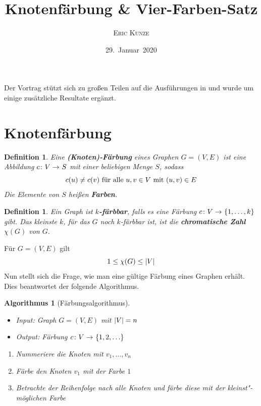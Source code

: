 \documentclass[ngerman, a4paper, 12pt]{article}
\newcommand{\begriff}[1]{\textbf{#1}}
\newcounter{themcount}
\theoremstyle{plain}
\newtheorem{definition}[themcount]{Definition}
\theoremstyle{break}
\newtheorem{algorithmus}[themcount]{Algorithmus}
\theoremstyle{proofstyle}
\begin{document}
	\title{\bfseries \sffamily \huge Knotenfärbung \& Vier-Farben-Satz}
	\author{\scshape Eric Kunze}
	\date{29.~Januar~2020}
	\maketitle
	{ \footnotesize \doclicenseThis }
	
	\singlespacing
	\tableofcontents
	\onehalfspacing
	
	\vspace{\parskip}
	
	Der Vortrag stützt sich zu großen Teilen auf die Ausführungen in \cite{buesing} und wurde um einige zusätzliche Resultate ergänzt.
	
\section{Knotenfärbung}
	
	\begin{definition}
		Eine \begriff{(Knoten)-Färbung} eines Graphen $G = (V,E)$ ist eine Abbildung $\abb{c}{V}{S}$ mit einer beliebigen Menge $S$, sodass
		\begin{equation}
			\label{eq: faerbung}
			c(u) \neq c(v) \text{ für alle } u,v \in V \mit (u,v) \in E
		\end{equation}
		Die Elemente von $S$ heißen \begriff{Farben}.
	\end{definition}

	\begin{definition}
		Ein Graph ist \begriff{$k$-färbbar}, falls es eine Färbung $\abb{c}{V}{\menge{1, \dots, k}}$ gibt. Das kleinste $k$, für das
		$G$ noch $k$-färbbar ist, ist die \begriff{chromatische Zahl} $\chi(G)$ von $G$.
	\end{definition}

	Für $G = (V,E)$ gilt 
	\begin{equation}
		1 \le \chi(G) \le \card{V}
		\label{eq: chi-kleiner-n}
	\end{equation}
	Nun stellt sich die Frage, wie man eine gültige Färbung eines Graphen erhält. Dies beantwortet der folgende Algorithmus.

	\begin{algorithmus}[Färbungsalgorithmus]
		\label{alg: faerbung}
		\begin{itemize}[nolistsep]
			\item Input: Graph $G = (V,E)$ mit $\left| V \right| = n$ 
			\item Output: Färbung $\abb{c}{V}{\menge{1, 2, \dots }}$
		\end{itemize}
		\begin{enumerate}[label=Schritt \arabic*:, leftmargin=*, nolistsep]
			\item Nummeriere die Knoten mit $v_1, \dots, v_n$
			\item Färbe den Knoten $v_1$ mit der Farbe $1$
			\item Betrachte der Reihenfolge nach alle Knoten und färbe diese mit der kleinst"-möglichen Farbe
		\end{enumerate}
	\end{algorithmus}
\end{document}
